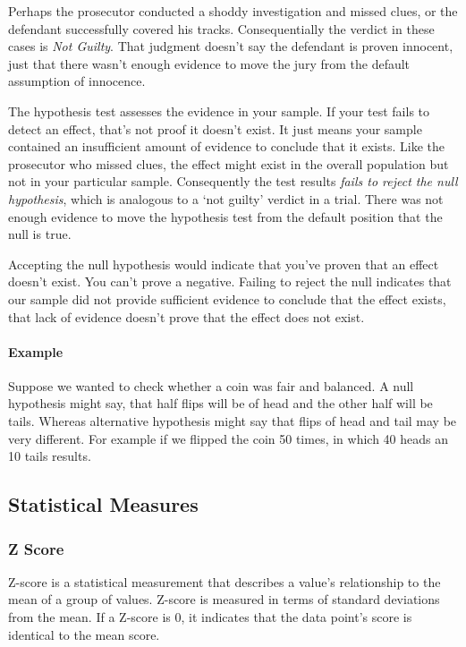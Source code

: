 \documentclass[11pt]{article}
\begin{document}
Perhaps the prosecutor conducted a shoddy investigation and missed
clues, or the defendant successfully covered his tracks. Consequentially
the verdict in these cases is \emph{Not Guilty}. That judgment doesn't
say the defendant is proven innocent, just that there wasn't enough
evidence to move the jury from the default assumption of innocence.

The hypothesis test assesses the evidence in your sample. If your test
fails to detect an effect, that's not proof it doesn't exist. It just
means your sample contained an insufficient amount of evidence to
conclude that it exists. Like the prosecutor who missed clues, the
effect might exist in the overall population but not in your particular
sample. Consequently the test results \emph{fails to reject the null
hypothesis}, which is analogous to a `not guilty' verdict in a trial.
There was not enough evidence to move the hypothesis test from the
default position that the null is true.

Accepting the null hypothesis would indicate that you've proven that an
effect doesn't exist. You can't prove a negative. Failing to reject the
null indicates that our sample did not provide sufficient evidence to
conclude that the effect exists, that lack of evidence doesn't prove
that the effect does not exist.

\hypertarget{example}{%
\paragraph{Example}\label{example}}
Suppose we wanted to check whether a coin was fair and balanced. A null
hypothesis might say, that half flips will be of head and the other half
will be tails. Whereas alternative hypothesis might say that flips of
head and tail may be very different.
For example if we flipped the coin 50 times, in which 40 heads an 10
tails results.

\hypertarget{statistical-measures}{%
\subsection{Statistical Measures}\label{statistical-measures}}

\hypertarget{z-score}{%
\subsubsection{Z Score}\label{z-score}}

Z-score is a statistical measurement that describes a value's
relationship to the mean of a group of values. Z-score is measured in
terms of standard deviations from the mean. If a Z-score is 0, it
indicates that the data point's score is identical to the mean score.
\end{document}
